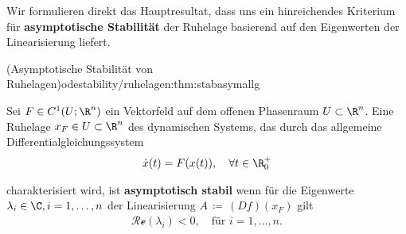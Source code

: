 \documentclass[letterpaper,10pt,german]{jupyterBook}
\begin{document}
\par
Wir formulieren direkt das Hauptresultat, dass uns ein hinreichendes Kriterium für \textbf{asymptotische Stabilität} der Ruhelage basierend auf den Eigenwerten der Linearisierung liefert.
\begin{theorem}{(Asymptotische Stabilität von Ruhelagen)}{odestability/ruhelagen:thm:stabasymallg}



\par
Sei \(F \in C^1(U; \R^n)\) ein Vektorfeld auf dem offenen Phasenraum \(U \subset \R^n\).
Eine Ruhelage \(x_F \in  U \subset \R^n\) des dynamischen Systems, das durch das allgemeine Differentialgleichungssystem
\begin{align*}
\dot{x}(t) = F(x(t)), \quad \forall t \in \R^+_0
\end{align*}
\par
charakterisiert wird, ist \textbf{asymptotisch stabil} wenn für die Eigenwerte \(\lambda_i \in \C, i=1,\ldots,n\) der Linearisierung \(A \, \coloneqq \, (Df)(x_F)\) gilt
\begin{align*}
\mathcal{Re}(\lambda_i)<0, \quad \text{für } i=1,\ldots,n.
\end{align*}\end{theorem}
\end{document}
